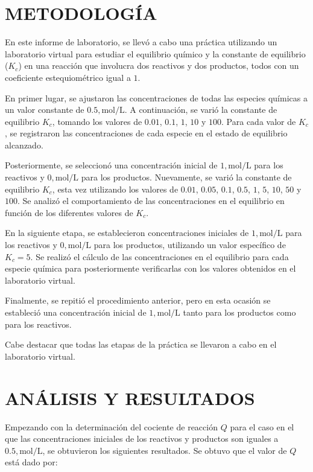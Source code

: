 \documentclass[10pt]{article}
\begin{document}
\begin{multicols*}{2}
    \section{\small METODOLOGÍA}
    En este informe de laboratorio, se llevó a cabo una práctica utilizando un laboratorio virtual para estudiar el equilibrio químico y la constante de equilibrio ($K_c$) en una reacción que involucra dos reactivos y dos productos, todos con un coeficiente estequiométrico igual a $1$.

    En primer lugar, se ajustaron las concentraciones de todas las especies químicas a un valor constante de $0.5 , \text{mol/L}$. A continuación, se varió la constante de equilibrio $K_c$, tomando los valores de $0.01$, $0.1$, $1$, $10$ y $100$. Para cada valor de $K_c$, se registraron las concentraciones de cada especie en el estado de equilibrio alcanzado.

    Posteriormente, se seleccionó una concentración inicial de $1 , \text{mol/L}$ para los reactivos y $0 , \text{mol/L}$ para los productos. Nuevamente, se varió la constante de equilibrio $K_c$, esta vez utilizando los valores de $0.01$, $0.05$, $0.1$, $0.5$, $1$, $5$, $10$, $50$ y $100$. Se analizó el comportamiento de las concentraciones en el equilibrio en función de los diferentes valores de $K_c$.

    En la siguiente etapa, se establecieron concentraciones iniciales de $1 , \text{mol/L}$ para los reactivos y $0 , \text{mol/L}$ para los productos, utilizando un valor específico de $K_c = 5$. Se realizó el cálculo de las concentraciones en el equilibrio para cada especie química para posteriormente verificarlas con los valores obtenidos en el laboratorio virtual.

    Finalmente, se repitió el procedimiento anterior, pero en esta ocasión se estableció una concentración inicial de $1 , \text{mol/L}$ tanto para los productos como para los reactivos.

    Cabe destacar que todas las etapas de la práctica se llevaron a cabo en el laboratorio virtual.

    \section{\small ANÁLISIS Y RESULTADOS}
        Empezando con la determinación del cociente de reacción $Q$ para el caso en el que las concentraciones iniciales de los reactivos y productos son iguales a $0.5 , \text{mol/L}$, se obtuvieron los siguientes resultados. Se obtuvo que el valor de $Q$ está dado por:


\end{multicols*}
\end{document}
